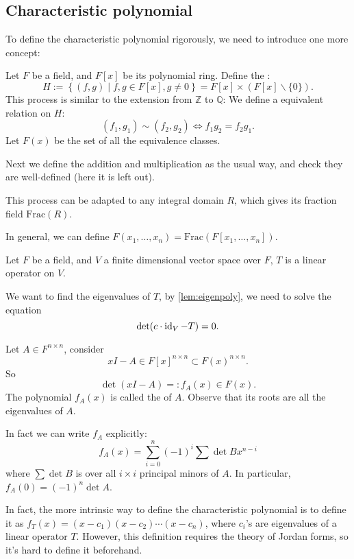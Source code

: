 \subsection{Characteristic polynomial}
\label{sub:Characteristic polynomial}

To define the characteristic polynomial rigorously,
we need to introduce one more concept:
\begin{definition}
	Let $F$ be a field, and $F[x]$ be its polynomial ring.
	Define the :
	\[
		H := \left\{(f,g)\mid f, g\in F[x], g\ne 0\right\}
		= F[x]\times (F[x]\backslash \{0\}).
	\]
	This process is similar to the extension from $\mathbb{Z}$ to $\mathbb{Q}$:
	We define a equivalent relation on $H$:
	\[
		(f_1,g_1)\sim(f_2,g_2)\iff f_1g_2=f_2g_1.
	\]
	Let $F(x)$ be the set of all the equivalence classes.

	Next we define the addition and multiplication as the usual way,
	and check they are well-defined (here it is left out).
\end{definition}
\begin{remark}
    This process can be adapted to any integral domain $R$,
	which gives its fraction field $\mathrm{Frac}(R)$.
\end{remark}

In general, we can define $F(x_1,\dots,x_n)= \mathrm{Frac}(F[x_1,\dots,x_n])$.

Let $F$ be a field, and $V$ a finite dimensional vector space over $F$,
$T$ is a linear operator on $V$.

We want to find the eigenvalues of $T$, by \autoref{lem:eigenpoly},
we need to solve the equation
 \[
\det(c\cdot \operatorname{id}_V - T) = 0.
\]
\begin{definition}
	Let $A\in F^{n \times n}$, consider
	\[
		xI-A\in F[x]^{n \times n} \subset F(x)^{n \times n}.
	\]
	So
	\[
	\det(xI-A) =: f_A(x)\in F(x).
	\]
	The polynomial $f_A(x)$ is called the  of $A$.
	Observe that its roots are all the eigenvalues of $A$.

	In fact we can write  $f_A$ explicitly:
	\[
	f_A(x) = \sum_{i=0}^{n} (-1)^i\sum \det B x^{n-i}
	\]
	where $\sum \det B$ is over all $i \times i$ principal minors of $A$.
	In particular, $f_A(0) = (-1)^n\det A$.
\end{definition}
\begin{remark}
    In fact, the more intrinsic way to define the characteristic polynomial
	is to define it as $f_T(x)=(x-c_1)(x-c_2)\cdots(x-c_n)$, where
	$c_i$'s are eigenvalues of a linear operator $T$.
	However, this definition requires the theory of Jordan forms,
	so it's hard to define it beforehand.
\end{remark}

